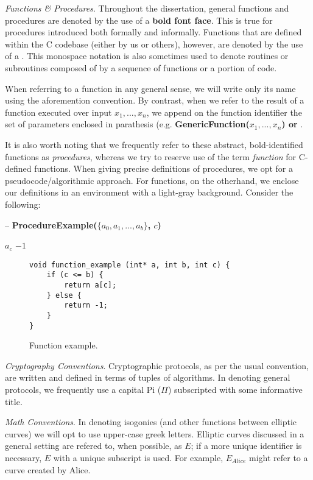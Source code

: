 \noindent
\textit{Functions \& Procedures}. Throughout the dissertation, general functions and procedures are denoted by the use of a \textbf{bold font face}. This is true for procedures introduced both formally and informally. Functions that are defined within the \sidh C codebase (either by us or others), however, are denoted by the use of a . This monospace notation is also sometimes used to denote routines or subroutines composed of by a sequence of functions or a portion of code. 

When referring to a function in any general sense, we will write only its name using the aforemention convention. By contrast, when we refer to the result of a function executed over input $x_{1}, ..., x_{n}$, we append on the function identifier the set of parameters enclosed in parathesis (e.g. \textbf{GenericFunction($x_{1}, ..., x_{n}$) or }. 

It is also worth noting that we frequently refer to these abstract, bold-identified functions as \textit{procedures}, whereas we try to reserve use of the term \textit{function} for C-defined \sidh functions. When giving precise definitions of procedures, we opt for a pseudocode/algorithmic approach. For functions, on the otherhand, we enclose our definitions in an environment with a light-gray background. Consider the following: \\

\begin{algorithm}
\caption{-- \textbf{ProcedureExample($\{a_0, a_1, ... , a_b\}$, $c$)}}\label{alg:procedureexample}
\begin{algorithmic}[1]
	\State \Return $a_c$
\Else
	\State \Return $-1$
\EndIf
\end{algorithmic}
\end{algorithm}

\begin{figure}[!h]
\label{code:pbinv}
\begin{lstlisting}
void function_example (int* a, int b, int c) {
	if (c <= b) {
		return a[c];
	} else {
		return -1;
	}
}
\end{lstlisting}
\caption{Function example.}
\end{figure}

\noindent
\textit{Cryptography Conventions}. Cryptographic protocols, as per the usual convention, are written and defined in terms of tuples of algorithms. In denoting general protocols, we frequently use a capital Pi ($\Pi$) subscripted with some informative title.

\noindent
\textit{Math Conventions}. In denoting isogonies (and other functions between elliptic curves) we will opt to use upper-case greek letters. Elliptic curves discussed in a general setting are refered to, when possible, as $E$; if a more unique identifier is necessary, $E$ with a unique subscript is used. For example, $E_{Alice}$ might refer to a curve created by Alice.  


